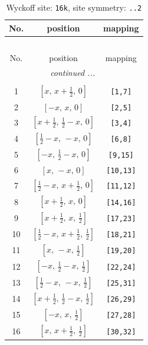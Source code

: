 \documentclass[fleqn,8pt]{jsarticle}
\begin{document}
\begin{longtable}{ccc}
\caption{Wyckoff site: {\tt 16k}, site symmetry: {\tt ..2}}
 \\
 \hline \hline
No. & position & mapping \\ \hline \endfirsthead

\multicolumn{2}{l}{\tablename\ \thetable{}} \\
 \hline \hline
No. & position & mapping \\ \hline \endhead

 \hline \hline
\multicolumn{2}{r}{\footnotesize\it continued ...} \\ \endfoot

 \hline \hline
\multicolumn{2}{r}{} \\ \endlastfoot

1 & $\left[ x,\, x + \frac{1}{2},\, 0 \right]$ & {\tt [1,7]} \\ \hline
2 & $\left[ - x,\, x,\, 0 \right]$ & {\tt [2,5]} \\ \hline
3 & $\left[ x + \frac{1}{2},\, \frac{1}{2} - x,\, 0 \right]$ & {\tt [3,4]} \\ \hline
4 & $\left[ \frac{1}{2} - x,\, - x,\, 0 \right]$ & {\tt [6,8]} \\ \hline
5 & $\left[ - x,\, \frac{1}{2} - x,\, 0 \right]$ & {\tt [9,15]} \\ \hline
6 & $\left[ x,\, - x,\, 0 \right]$ & {\tt [10,13]} \\ \hline
7 & $\left[ \frac{1}{2} - x,\, x + \frac{1}{2},\, 0 \right]$ & {\tt [11,12]} \\ \hline
8 & $\left[ x + \frac{1}{2},\, x,\, 0 \right]$ & {\tt [14,16]} \\ \hline
9 & $\left[ x + \frac{1}{2},\, x,\, \frac{1}{2} \right]$ & {\tt [17,23]} \\ \hline
10 & $\left[ \frac{1}{2} - x,\, x + \frac{1}{2},\, \frac{1}{2} \right]$ & {\tt [18,21]} \\ \hline
11 & $\left[ x,\, - x,\, \frac{1}{2} \right]$ & {\tt [19,20]} \\ \hline
12 & $\left[ - x,\, \frac{1}{2} - x,\, \frac{1}{2} \right]$ & {\tt [22,24]} \\ \hline
13 & $\left[ \frac{1}{2} - x,\, - x,\, \frac{1}{2} \right]$ & {\tt [25,31]} \\ \hline
14 & $\left[ x + \frac{1}{2},\, \frac{1}{2} - x,\, \frac{1}{2} \right]$ & {\tt [26,29]} \\ \hline
15 & $\left[ - x,\, x,\, \frac{1}{2} \right]$ & {\tt [27,28]} \\ \hline
16 & $\left[ x,\, x + \frac{1}{2},\, \frac{1}{2} \right]$ & {\tt [30,32]} \\
\end{longtable}
\end{document}
